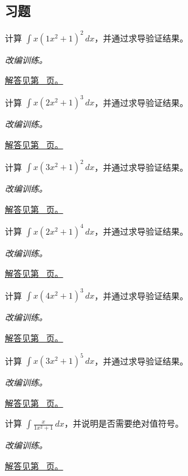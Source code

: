 \documentclass[12pt,fontset=fandol]{ctexart}
\begin{document}
\subsection{习题}
\begin{example}[识别幂函数的内层导数]\label{ex:c12q1}
计算 $\displaystyle\int x(1x^2+1)^{2}\,dx$，并通过求导验证结果。
\par\textit{改编训练。}\par\hyperref[ans:c12q1]{解答见第~\pageref{ans:c12q1} 页。}
\end{example}
\begin{example}[识别幂函数的内层导数]\label{ex:c12q2}
计算 $\displaystyle\int x(2x^2+1)^{3}\,dx$，并通过求导验证结果。
\par\textit{改编训练。}\par\hyperref[ans:c12q2]{解答见第~\pageref{ans:c12q2} 页。}
\end{example}
\begin{example}[识别幂函数的内层导数]\label{ex:c12q3}
计算 $\displaystyle\int x(3x^2+1)^{2}\,dx$，并通过求导验证结果。
\par\textit{改编训练。}\par\hyperref[ans:c12q3]{解答见第~\pageref{ans:c12q3} 页。}
\end{example}
\begin{example}[识别幂函数的内层导数]\label{ex:c12q4}
计算 $\displaystyle\int x(2x^2+1)^{4}\,dx$，并通过求导验证结果。
\par\textit{改编训练。}\par\hyperref[ans:c12q4]{解答见第~\pageref{ans:c12q4} 页。}
\end{example}
\begin{example}[识别幂函数的内层导数]\label{ex:c12q5}
计算 $\displaystyle\int x(4x^2+1)^{3}\,dx$，并通过求导验证结果。
\par\textit{改编训练。}\par\hyperref[ans:c12q5]{解答见第~\pageref{ans:c12q5} 页。}
\end{example}
\begin{example}[识别幂函数的内层导数]\label{ex:c12q6}
计算 $\displaystyle\int x(3x^2+1)^{5}\,dx$，并通过求导验证结果。
\par\textit{改编训练。}\par\hyperref[ans:c12q6]{解答见第~\pageref{ans:c12q6} 页。}
\end{example}
\begin{example}[分母导数型积分]\label{ex:c12q7}
计算 $\displaystyle\int\frac{x}{1x^2+1}\,dx$，并说明是否需要绝对值符号。
\par\textit{改编训练。}\par\hyperref[ans:c12q7]{解答见第~\pageref{ans:c12q7} 页。}
\end{example}
\end{document}
